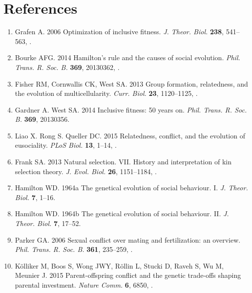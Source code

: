 \documentclass[12pt]{article}
\begin{document}
\section*{References}
\begin{enumerate}

\item{Grafen A. 2006 {Optimization of inclusive fitness}. \textit{J. Theor. Biol.} 
  \textbf{238}, 541--563,
  .}

\item{Bourke AFG. 2014 {Hamilton's rule and the causes of social evolution}.
  \textit{Phil. Trans. R. Soc. B.} \textbf{369},
  20130362, .}

\item{Fisher RM, Cornwallis CK, West SA. 2013 {Group formation,
  relatedness, and the evolution of multicellularity}. \textit{Curr. Biol.}
  \textbf{23}, 1120--1125, .}

\item{Gardner A. West SA. 2014 {Inclusive fitness: 50 years on}.
  \textit{Phil. Trans. R. Soc. B.} \textbf{369}, 20130356.}

\item{Liao X. Rong S. Queller DC. 2015 {Relatedness, conflict, and the
  evolution of eusociality}. \textit{PLoS Biol.} \textbf{13}, 1--14,
  .}

\item{Frank SA. 2013 {Natural selection. VII. History and interpretation of kin
  selection theory}. \textit{J. Evol. Biol.} \textbf{26},
  1151--1184, .}

\item{Hamilton WD. 1964a {The genetical evolution of social behaviour. I}.
  \textit{J. Theor. Biol.} \textbf{7}, 1--16.}

\item{Hamilton WD. 1964b {The genetical evolution of social behaviour. II}.
  \textit{J. Theor. Biol.} \textbf{7}, 17--52.}

\item{Parker GA. 2006 {Sexual conflict over mating and fertilization: an
  overview}. \textit{Phil. Trans. R. Soc. B.}
  \textbf{361}, 235--259, .}

\item{K{\"{o}}lliker M, Boos S, Wong JWY, R{\"{o}}llin L, Stucki D,
  Raveh S, Wu M, Meunier J. 2015 {Parent-offspring conflict and the
  genetic trade-offs shaping parental investment}. \textit{Nature
  Comm.} \textbf{6}, 6850, .}


\end{enumerate}
\end{document}
